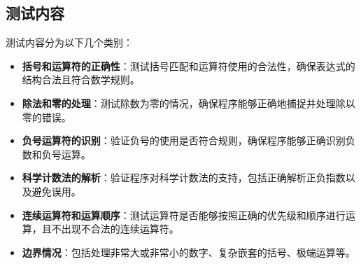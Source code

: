 \documentclass[UTF8]{ctexart}
\begin{document}
\subsection{测试内容}

测试内容分为以下几个类别：

\begin{itemize}
    \item \textbf{括号和运算符的正确性}：测试括号匹配和运算符使用的合法性，确保表达式的结构合法且符合数学规则。
    \item \textbf{除法和零的处理}：测试除数为零的情况，确保程序能够正确地捕捉并处理除以零的错误。
    \item \textbf{负号运算符的识别}：验证负号的使用是否符合规则，确保程序能够正确识别负数和负号运算。
    \item \textbf{科学计数法的解析}：验证程序对科学计数法的支持，包括正确解析正负指数以及避免误用。
    \item \textbf{连续运算符和运算顺序}：测试运算符是否能够按照正确的优先级和顺序进行运算，且不出现不合法的连续运算符。
    \item \textbf{边界情况}：包括处理非常大或非常小的数字、复杂嵌套的括号、极端运算等。
\end{itemize}
\end{document}

